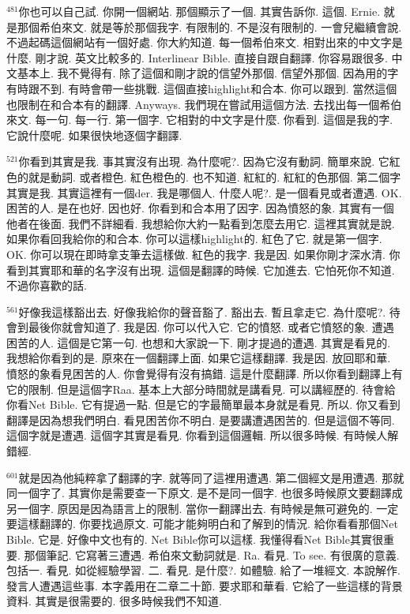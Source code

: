 \documentclass{book}
\begin{document}
$^{481}$你也可以自己試.
你開一個網站.
那個顯示了一個.
其實告訴你.
這個.
Ernie.
就是那個希伯來文.
就是等於那個我字.
有限制的.
不是沒有限制的.
一會兒繼續會說.
不過起碼這個網站有一個好處.
你大約知道.
每一個希伯來文.
相對出來的中文字是什麼.
剛才說.
英文比較多的.
Interlinear Bible.
直接自跟自翻譯.
你容易跟很多.
中文基本上.
我不覺得有.
除了這個和剛才說的信望外那個.
信望外那個.
因為用的字有時跟不到.
有時會帶一些挑戰.
這個直接highlight和合本.
你可以跟到.
當然這個也限制在和合本有的翻譯.
Anyways.
我們現在嘗試用這個方法.
去找出每一個希伯來文.
每一句.
每一行.
第一個字.
它相對的中文字是什麼.
你看到.
這個是我的字.
它說什麼呢.
如果很快地逐個字翻譯.

$^{521}$你看到其實是我.
事其實沒有出現.
為什麼呢?.
因為它沒有動詞.
簡單來說.
它紅色的就是動詞.
或者橙色.
紅色橙色的.
也不知道.
紅紅的.
紅紅的色那個.
第二個字其實是我.
其實這裡有一個der.
我是哪個人.
什麼人呢?.
是一個看見或者遭遇.
OK.
困苦的人.
是在也好.
因也好.
你看到和合本用了因字.
因為憤怒的象.
其實有一個他者在後面.
我們不詳細看.
我想給你大約一點看到怎麼去用它.
這裡其實就是說.
如果你看回我給你的和合本.
你可以這樣highlight的.
紅色了它.
就是第一個字.
OK.
你可以現在即時拿支筆去這樣做.
紅色的我字.
我是因.
如果你剛才深水清.
你看到其實耶和華的名字沒有出現.
這個是翻譯的時候.
它加進去.
它怕死你不知道.
不過你喜歡的話.

$^{561}$好像我這樣豁出去.
好像我給你的聲音豁了.
豁出去.
暫且拿走它.
為什麼呢?.
待會到最後你就會知道了.
我是因.
你可以代入它.
它的憤怒.
或者它憤怒的象.
遭遇困苦的人.
這個是它第一句.
也想和大家說一下.
剛才提過的遭遇.
其實是看見的.
我想給你看到的是.
原來在一個翻譯上面.
如果它這樣翻譯.
我是因.
放回耶和華.
憤怒的象看見困苦的人.
你會覺得有沒有搞錯.
這是什麼翻譯.
所以你看到翻譯上有它的限制.
但是這個字Raa.
基本上大部分時間就是講看見.
可以講經歷的.
待會給你看Net Bible.
它有提過一點.
但是它的字最簡單最本身就是看見.
所以.
你又看到翻譯是因為想我們明白.
看見困苦你不明白.
是要講遭遇困苦的.
但是這個不等同.
這個字就是遭遇.
這個字其實是看見.
你看到這個邏輯.
所以很多時候.
有時候人解錯經.

$^{601}$就是因為他純粹拿了翻譯的字.
就等同了這裡用遭遇.
第二個經文是用遭遇.
那就同一個字了.
其實你是需要查一下原文.
是不是同一個字.
也很多時候原文要翻譯成另一個字.
原因是因為語言上的限制.
當你一翻譯出去.
有時候是無可避免的.
一定要這樣翻譯的.
你要找過原文.
可能才能夠明白和了解到的情況.
給你看看那個Net Bible.
它是.
好像中文也有的.
Net Bible你可以這樣.
我懂得看Net Bible其實很重要.
那個筆記.
它寫著三遭遇.
希伯來文動詞就是.
Ra.
看見.
To see.
有很廣的意義.
包括一.
看見.
如從經驗學習.
二.
看見.
是什麼?.
如體驗.
給了一堆經文.
本說解作.
發言人遭遇這些事.
本字義用在二章二十節.
要求耶和華看.
它給了一些這樣的背景資料.
其實是很需要的.
很多時候我們不知道.
\end{document}
